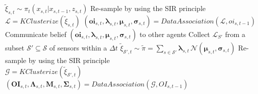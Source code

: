 \begin{frame}
\begin{columns}[T]
{			
			
			\centering
			
		}
		
		{
			\begin{algorithm}[H]
				\tiny
				\BlankLine
				\BlankLine
				\BlankLine
				\Begin
				{
					$ \tilde{\xi}_{s,t} \sim \pi_t (x_{s,t} | x_{s,t-1},z_{s,t}) $
					\BlankLine
					Re-sample by using the SIR principle\\
					\BlankLine
					$ \mathcal{L} = KClusterize(\tilde{\xi}_{s,t}) $
					\BlankLine
					$ (\boldsymbol{oi}_{s,t},\boldsymbol\lambda_{s,t},\boldsymbol\mu_{s,t},\boldsymbol\sigma_{s,t}) = DataAssociation(\mathcal{L}, oi_{s,t-1}) $
					\BlankLine
					Communicate belief $ (\boldsymbol{oi}_{s,t},\boldsymbol\lambda_{s,t},\boldsymbol\mu_{s,t},\boldsymbol\sigma_{s,t}) $ to other agents
				}
				\BlankLine
				\Begin
				{
					\textcolor{lightred}{Collect $ \mathcal{L}_{S'} $ from a subset $ \mathcal{S'} \subseteq \mathcal{S} $ of sensors within a $ \Delta t $}
					\BlankLine
					\textcolor{lightred}{$ \tilde{\xi}_{\mathcal{S'},t} \sim \tilde\pi = \sum_{s \in \mathcal{S'}} \boldsymbol\lambda_{s,t} \, \mathcal{N} (\boldsymbol\mu_{s,t},\boldsymbol\sigma_{s,t}) $}
					\BlankLine
					\textcolor{lightred}{Re-sample by using the SIR principle}\\
					\BlankLine
					\textcolor{lightred}{$ \mathcal{G} = KClusterize(\tilde\xi_{{\mathcal{S'},t}}) $}
					\BlankLine
					\textcolor{lightred}{$ (\boldsymbol{OI}_{s,t},\boldsymbol\Lambda_{s,t},\boldsymbol{M}_{s,t},\boldsymbol\Sigma_{s,t}) = DataAssociation(\mathcal{G},OI_{s,t-1}) $}
				}
			\end{algorithm}
			
}
\end{columns}
\end{frame}
